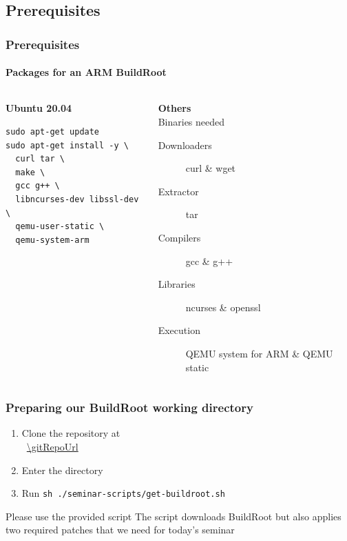 \subsection{Prerequisites}
\begin{frame}[fragile]
  \frametitle{Prerequisites}
  \framesubtitle{Packages for an ARM BuildRoot}
  \begin{columns}[t]
    \begin{column}{.5\textwidth}
      \textbf{Ubuntu 20.04}
      \begin{lstlisting}
sudo apt-get update
sudo apt-get install -y \
  curl tar \
  make \
  gcc g++ \
  libncurses-dev libssl-dev \
  qemu-user-static \
  qemu-system-arm
      \end{lstlisting}
    \end{column}
    \begin{column}{.5\textwidth}
      \textbf{Others} \\
      {\small Binaries needed}
      \begin{description}
        \item[Downloaders] curl \& wget
        \item[Extractor] tar
        \item[Compilers] gcc \& g++
        \item[Libraries] ncurses \& openssl
        \item[Execution] QEMU system for ARM \& QEMU static
      \end{description}
    \end{column}
  \end{columns}
\end{frame}
\begin{frame}
  \frametitle{Preparing our BuildRoot working directory}
  \begin{enumerate}
    \item Clone the repository at \\ \mbox{ \url{\gitRepoUrl} }
    \item Enter the directory
    \item Run \texttt{sh ./seminar-scripts/get-buildroot.sh}
  \end{enumerate}
  \begin{alertblock}{Please use the provided script}
    The script downloads BuildRoot \buildrootLatestVersion \; but also applies two required patches that we need for today's seminar
  \end{alertblock}
\end{frame}
